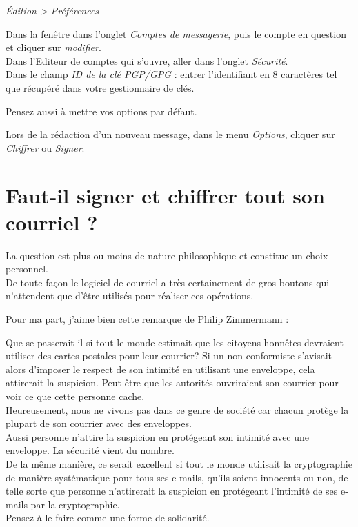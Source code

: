 \emph{Édition \textgreater{} Préférences}

Dans la fenêtre dans l'onglet \emph{Comptes de messagerie}, puis le
compte en question et cliquer sur \emph{modifier}.\\Dans l'Editeur de
comptes qui s'ouvre, aller dans l'onglet \emph{Sécurité}.\\Dans le champ
\emph{ID de la clé PGP/GPG} : entrer l'identifiant en 8 caractères tel
que récupéré dans votre gestionnaire de clés.

Pensez aussi à mettre vos options par défaut.

Lors de la rédaction d'un nouveau message, dans le menu \emph{Options},
cliquer sur \emph{Chiffrer} ou \emph{Signer}.

\section{Faut-il signer et chiffrer tout son courriel ?}\label{faut-il-signer-et-chiffrer-tout-son-courriel}

La question est plus ou moins de nature philosophique et constitue un
choix personnel.\\De toute façon le logiciel de courriel a très
certainement de gros boutons qui n'attendent que d'être utilisés pour
réaliser ces opérations.

Pour ma part, j'aime bien cette remarque de Philip Zimmermann :

\begin{quoting}
Que se passerait-il si tout le monde estimait que les citoyens honnêtes
devraient utiliser des cartes postales pour leur courrier? Si un
non-conformiste s'avisait alors d'imposer le respect de son intimité en
utilisant une enveloppe, cela attirerait la suspicion. Peut-être que les
autorités ouvriraient son courrier pour voir ce que cette personne
cache.\\Heureusement, nous ne vivons pas dans ce genre de société car
chacun protège la plupart de son courrier avec des enveloppes.\\Aussi
personne n'attire la suspicion en protégeant son intimité avec une
enveloppe. La sécurité vient du nombre.\\De la même manière, ce serait
excellent si tout le monde utilisait la cryptographie de manière
systématique pour tous ses e-mails, qu'ils soient innocents ou non, de
telle sorte que personne n'attirerait la suspicion en protégeant
l'intimité de ses e-mails par la cryptographie.\\Pensez à le faire comme
une forme de solidarité.
\end{quoting}

